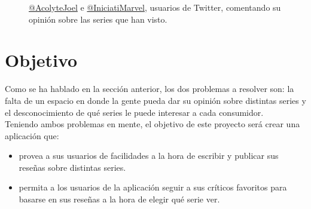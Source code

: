 \begin{figure}[H]
	\caption{ \href{https://twitter.com/AcolyteJoel}{@AcolyteJoel} e
    \href{https://twitter.com/IniciatiMarvel}{@IniciatiMarvel}, usuarios de Twitter, comentando su opinión sobre las
    series que han visto. }\label{fig:twitter_threads}
\end{figure}

\section{Objetivo}\label{sec:objetivo}
Como se ha hablado en la sección anterior, los dos problemas a resolver son: la falta de un espacio en donde la gente
pueda dar su opinión sobre distintas series y el desconocimiento de qué series le puede interesar a cada consumidor.\\

Teniendo ambos problemas en mente, el objetivo de este proyecto será crear una aplicación que:

\begin{itemize}
    \item provea a sus usuarios de facilidades a la hora de escribir y publicar sus reseñas sobre distintas series.
    \item permita a los usuarios de la aplicación seguir a sus críticos favoritos para basarse en sus reseñas a la hora
    de elegir qué serie ver.
\end{itemize}
